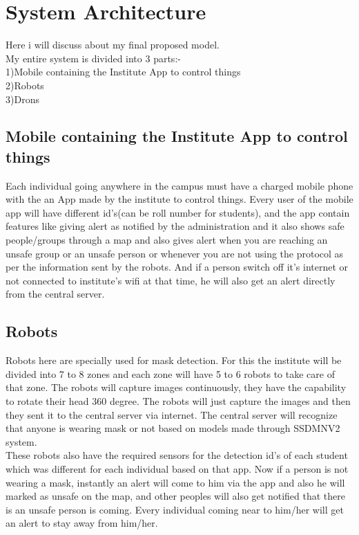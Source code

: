 \documentclass[10pt,twocolumn,letterpaper]{article}
\begin{document}
\section{System Architecture}
Here i will discuss about my final proposed model.\\
My entire system is divided into 3 parts:-\\
1)Mobile containing the Institute App to control things\\
2)Robots\\
3)Drons\\
\subsection{Mobile containing the Institute App to control things }
Each individual going anywhere in the campus must have a charged mobile phone with the an App made by the institute to control things. Every user of the mobile app will have different id's(can be roll number for students), and the app contain features like giving alert as notified by the administration and it also shows safe people/groups through a map and also gives alert when you are reaching an unsafe group or an unsafe person or whenever you are not using the protocol as per the information sent by the robots. And if a person switch off it's internet or not connected to institute's wifi at that time, he will also get an alert directly from the central server.
\subsection{Robots}
Robots here are specially used for mask detection.  For this the institute will be divided into 7 to 8 zones and each zone will have 5 to 6 robots to take care of that zone. The robots will capture images continuously, they have the capability to rotate their head 360 degree. The robots will just capture the images and then they sent it to the central server via internet.
The central server will recognize that anyone is wearing mask or not based on models made through SSDMNV2 system.\\
These robots also have the required sensors for the detection id's of each student which was different for each individual based on that app. Now if a person is not wearing a mask, instantly an alert will come to him via the app and also he will marked as unsafe on the map, and other peoples will also get notified that there is an unsafe person is coming. Every individual coming near to him/her will get an alert to stay away from him/her.
\end{document}
